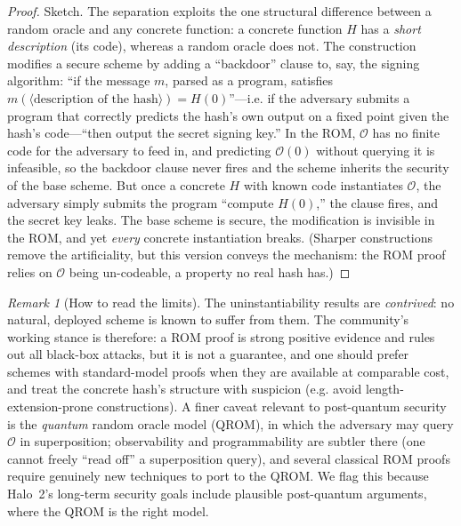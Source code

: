 \documentclass[11pt,a4paper]{article}
\theoremstyle{definition}
\theoremstyle{remark}
\newtheorem{remark}[theorem]{Remark}
\begin{document}
\begin{proof}
Sketch. The separation exploits the one structural difference between a random oracle and any concrete function: a concrete function \(H\) has a \emph{short description} (its code), whereas a random oracle does not. The construction modifies a secure scheme by adding a ``backdoor'' clause to, say, the signing algorithm: ``if the message \(m\), parsed as a program, satisfies \(m(\langle\text{description of the hash}\rangle) = H(0)\)''---i.e. if the adversary submits a program that correctly predicts the hash's own output on a fixed point given the hash's code---``then output the secret signing key.'' In the ROM, \(\mathcal{O}\) has no finite code for the adversary to feed in, and predicting \(\mathcal{O}(0)\) without querying it is infeasible, so the backdoor clause never fires and the scheme inherits the security of the base scheme. But once a concrete \(H\) with known code instantiates \(\mathcal{O}\), the adversary simply submits the program ``compute \(H(0)\),'' the clause fires, and the secret key leaks. The base scheme is secure, the modification is invisible in the ROM, and yet \emph{every} concrete instantiation breaks. (Sharper constructions remove the artificiality, but this version conveys the mechanism: the ROM proof relies on \(\mathcal{O}\) being un-codeable, a property no real hash has.)
\end{proof}

\begin{remark}[How to read the limits]\label{hash:rem:romstance}
The uninstantiability results are \emph{contrived}: no natural, deployed scheme is known to suffer from them. The community's working stance is therefore: a ROM proof is strong positive evidence and rules out all black-box attacks, but it is not a guarantee, and one should prefer schemes with standard-model proofs when they are available at comparable cost, and treat the concrete hash's structure with suspicion (e.g. avoid length-extension-prone constructions). A finer caveat relevant to post-quantum security is the \emph{quantum} random oracle model (QROM), in which the adversary may query \(\mathcal{O}\) in superposition; observability and programmability are subtler there (one cannot freely ``read off'' a superposition query), and several classical ROM proofs require genuinely new techniques to port to the QROM. We flag this because Halo~2's long-term security goals include plausible post-quantum arguments, where the QROM is the right model.
\end{remark}
\end{document}
